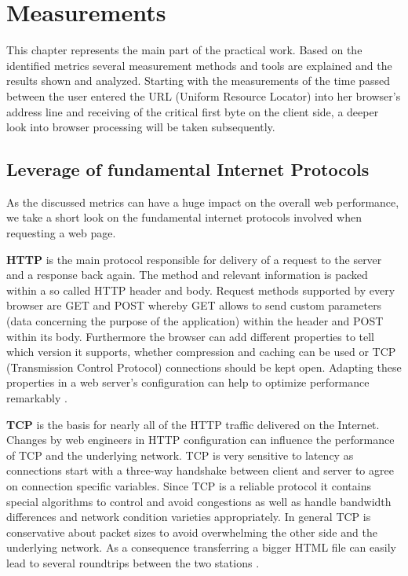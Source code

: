 \chapter{Measurements}
\label{chap:measurements}

This chapter represents the main part of the practical work. Based on the identified metrics several measurement methods and tools are explained and the results shown and analyzed. Starting with the measurements of the time passed between the user entered the URL (Uniform Resource Locator) into her browser's address line and receiving of the critical first byte on the client side, a deeper look into browser processing will be taken subsequently.

\section{Leverage of fundamental Internet Protocols}
As the discussed metrics can have a huge impact on the overall web performance, we take a short look on the fundamental internet protocols involved when requesting a web page. 

\textbf{HTTP} is the main protocol responsible for delivery of a request to the server and a response back again. The method and relevant information is packed within a so called HTTP header and body. Request methods supported by every browser are GET and POST whereby GET allows to send custom parameters (data concerning the purpose of the application) within the header and POST within its body. Furthermore the browser can add different properties to tell which version it supports, whether compression and caching can be used or TCP (Transmission Control Protocol) connections should be kept open. Adapting these properties in a web server's configuration can help to optimize performance remarkably \cite{Chang_2008}.

\textbf{TCP} is the basis for nearly all of the HTTP traffic delivered on the Internet. Changes by web engineers in HTTP configuration can influence the performance of TCP and the underlying network. TCP is very sensitive to latency as connections start with a three-way handshake between client and server to agree on connection specific variables. Since TCP is a reliable protocol it contains special algorithms to control and avoid congestions as well as handle bandwidth differences and network condition varieties appropriately. In general TCP is conservative about packet sizes to avoid overwhelming the other side and the underlying network. As a consequence transferring a bigger HTML file can easily lead to several roundtrips between the two stations \cite{Grigorik_2013}. 

